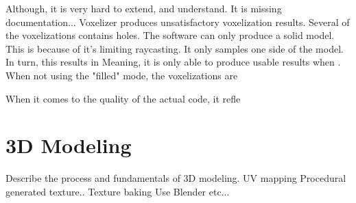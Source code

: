 Although, it is very hard to extend, and understand. It is missing documentation...
Voxelizer produces unsatisfactory voxelization results. Several of the voxelizations contains holes.
The software can only produce a solid model. This is because of it's limiting raycasting. It only samples one side of the model. In turn, this results in 
Meaning, it is only able to produce usable results when . When not using the "filled" mode, the voxelizations are

When it comes to the quality of the actual code, it refle

\section{3D Modeling}
Describe the process and fundamentals of 3D modeling.
UV mapping
Procedural generated texture..
Texture baking
Use Blender etc...
